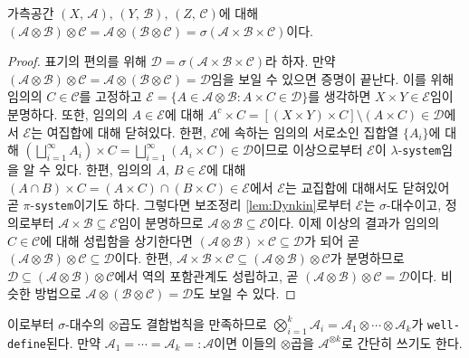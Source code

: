 \begin{theorem}\label{thm:productSigmaAlgebraAssoci}
    가측공간 $(X,\,\mathcal{A}),\,(Y,\,\mathcal{B}),\,(Z,\,\mathcal{C})$에 대해 $(\mathcal{A}\otimes\mathcal{B})\otimes\mathcal{C}=\mathcal{A}\otimes(\mathcal{B}\otimes\mathcal{C})=\sigma(\mathcal{A}\times\mathcal{B}\times\mathcal{C})$이다.
\end{theorem}

\begin{proof}
    표기의 편의를 위해 $\mathcal{D}=\sigma(\mathcal{A}\times\mathcal{B}\times\mathcal{C})$라 하자. 만약 $(\mathcal{A}\otimes\mathcal{B})\otimes\mathcal{C}=\mathcal{A}\otimes(\mathcal{B}\otimes\mathcal{C})=\mathcal{D}$임을 보일 수 있으면 증명이 끝난다. 이를 위해 임의의 $C\in\mathcal{C}$를 고정하고 $\mathcal{E}=\{A\in\mathcal{A}\otimes\mathcal{B}:A\times C\in\mathcal{D}\}$를 생각하면 $X\times Y\in\mathcal{E}$임이 분명하다. 또한, 임의의 $A\in\mathcal{E}$에 대해 $A^c\times C=[(X\times Y)\times C]\setminus (A\times C)\in\mathcal{D}$에서 $\mathcal{E}$는 여집합에 대해 닫혀있다. 한편, $\mathcal{E}$에 속하는 임의의 서로소인 집합열 $\{A_i\}$에 대해 $(\bigsqcup_{i=1}^\infty A_i)\times C=\bigsqcup_{i=1}^\infty(A_i\times C)\in\mathcal{D}$이므로 이상으로부터 $\mathcal{E}$이 $\lambda$-\texttt{system}임을 알 수 있다. 한편, 임의의 $A,\,B\in\mathcal{E}$에 대해 $(A\cap B)\times C=(A\times C)\cap(B\times C)\in\mathcal{E}$에서 $\mathcal{E}$는 교집합에 대해서도 닫혀있어 곧 $\pi$-\texttt{system}이기도 하다. 그렇다면 보조정리 \ref{lem:Dynkin}로부터 $\mathcal{E}$는 $\sigma$-대수이고, 정의로부터 $\mathcal{A}\times\mathcal{B}\subseteq\mathcal{E}$임이 분명하므로 $\mathcal{A}\otimes\mathcal{B}\subseteq\mathcal{E}$이다. 이제 이상의 결과가 임의의 $C\in\mathcal{C}$에 대해 성립함을 상기한다면 $(\mathcal{A}\otimes\mathcal{B})\times\mathcal{C}\subseteq\mathcal{D}$가 되어 곧 $(\mathcal{A}\otimes\mathcal{B})\otimes\mathcal{C}\subseteq\mathcal{D}$이다. 한편, $\mathcal{A}\times\mathcal{B}\times\mathcal{C}\subseteq(\mathcal{A}\otimes\mathcal{B})\otimes\mathcal{C}$가 분명하므로 $\mathcal{D}\subseteq(\mathcal{A}\otimes\mathcal{B})\otimes\mathcal{C}$에서 역의 포함관계도 성립하고, 곧 $(\mathcal{A}\otimes\mathcal{B})\otimes\mathcal{C}=\mathcal{D}$이다. 비슷한 방법으로 $\mathcal{A}\otimes(\mathcal{B}\otimes\mathcal{C})=\mathcal{D}$도 보일 수 있다.
\end{proof}

이로부터 $\sigma$-대수의 $\otimes$곱도 결합법칙을 만족하므로 $\bigotimes_{i=1}^k\mathcal{A}_i=\mathcal{A}_1\otimes\cdots\otimes\mathcal{A}_k$가 \texttt{well-define}된다. 만약 $\mathcal{A}_1=\cdots=\mathcal{A}_k=:\mathcal{A}$이면 이들의 $\otimes$곱을 $\mathcal{A}^{\otimes k}$로 간단히 쓰기도 한다.

